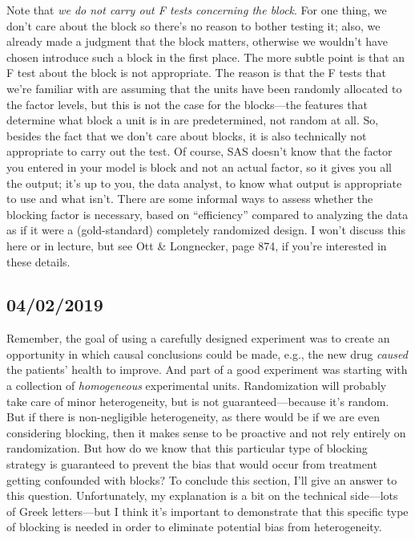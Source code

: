 \documentclass[a4paper, 12pt]{article}
\theoremstyle{plain}
\theoremstyle{definition}
\theoremstyle{remark}
\begin{document}
Note that {\em we do not carry out F tests concerning the block}.  For one thing, we don't care about the block so there's no reason to bother testing it; also, we already made a judgment that the block matters, otherwise we wouldn't have chosen introduce such a block in the first place.  The more subtle point is that an F test about the block is not appropriate.  The reason is that the F tests that we're familiar with are assuming that the units have been randomly allocated to the factor levels, but this is not the case for the blocks---the features that determine what block a unit is in are predetermined, not random at all.  So, besides the fact that we don't care about blocks, it is also technically not appropriate to carry out the test.  Of course, SAS doesn't know that the factor you entered in your model is block and not an actual factor, so it gives you all the output; it's up to you, the data analyst, to know what output is appropriate to use and what isn't.  There are some informal ways to assess whether the blocking factor is necessary, based on ``efficiency'' compared to analyzing the data as if it were a (gold-standard) completely randomized design.  I won't discuss this here or in lecture, but see Ott \& Longnecker, page 874, if you're interested in these details.  


\subsection*{04/02/2019}

Remember, the goal of using a carefully designed experiment was to create an opportunity in which causal conclusions could be made, e.g., the new drug {\em caused} the patients' health to improve.  And part of a good experiment was starting with a collection of {\em homogeneous} experimental units.  Randomization will probably take care of minor heterogeneity, but is not guaranteed---because it's random.  But if there is non-negligible heterogeneity, as there would be if we are even considering blocking, then it makes sense to be proactive and not rely entirely on randomization.  But how do we know that this particular type of blocking strategy is guaranteed to prevent the bias that would occur from treatment getting confounded with blocks?  To conclude this section, I'll give an answer to this question.  Unfortunately, my explanation is a bit on the technical side---lots of Greek letters---but I think it's important to demonstrate that this specific type of blocking is needed in order to eliminate potential bias from heterogeneity.  
\end{document}
